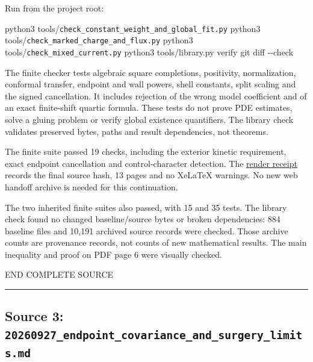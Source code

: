 \documentclass[
  10pt,
]{article}
\newenvironment{Shaded}{}{}
\newcommand{\ExtensionTok}[1]{#1}
\newcommand{\FunctionTok}[1]{\textcolor[rgb]{0.02,0.16,0.49}{#1}}
\newcommand{\NormalTok}[1]{#1}
\begin{document}
Run from the project root:

\begin{Shaded}
\begin{Highlighting}[]
\ExtensionTok{python3}\NormalTok{ tools/\nolinkurl{check_constant_weight_and_global_fit.py}}
\ExtensionTok{python3}\NormalTok{ tools/\nolinkurl{check_marked_charge_and_flux.py}}
\ExtensionTok{python3}\NormalTok{ tools/\nolinkurl{check_mixed_current.py}}
\ExtensionTok{python3}\NormalTok{ tools/library.py verify}
\FunctionTok{git}\NormalTok{ diff {-}{-}check}
\end{Highlighting}
\end{Shaded}

The finite checker tests algebraic square completions, positivity,
normalization, conformal transfer, endpoint and wall powers, shell
constants, split scaling and the signed cancellation. It includes
rejection of the wrong model coefficient and of an exact finite-shift
quartic formula. These tests do not prove PDE estimates, solve a gluing
problem or verify global existence quantifiers. The library check
validates preserved bytes, paths and result dependencies, not theorems.

The finite suite passed 19 checks, including the exterior kinetic
requirement, exact endpoint cancellation and control-character
detection. The \href{20260927_constant_weight_render.json}{render
receipt} records the final source hash, 13 pages and no XeLaTeX
warnings. No new web handoff archive is needed for this continuation.

The two inherited finite suites also passed, with 15 and 35 tests. The
library check found no changed baseline/source bytes or broken
dependencies: 884 baseline files and 10,191 archived source records were
checked. Those archive counts are provenance records, not counts of new
mathematical results. The main inequality and proof on PDF page 6 were
visually checked.

END COMPLETE SOURCE

\begin{center}\rule{0.5\linewidth}{0.5pt}\end{center}

\hypertarget{source-3-20260927_endpoint_covariance_and_surgery_limits.md}{%
\subsection{Source 3:
\nolinkurl{20260927_endpoint_covariance_and_surgery_limits.md}}\label{source-3-20260927_endpoint_covariance_and_surgery_limits.md}}
\end{document}
